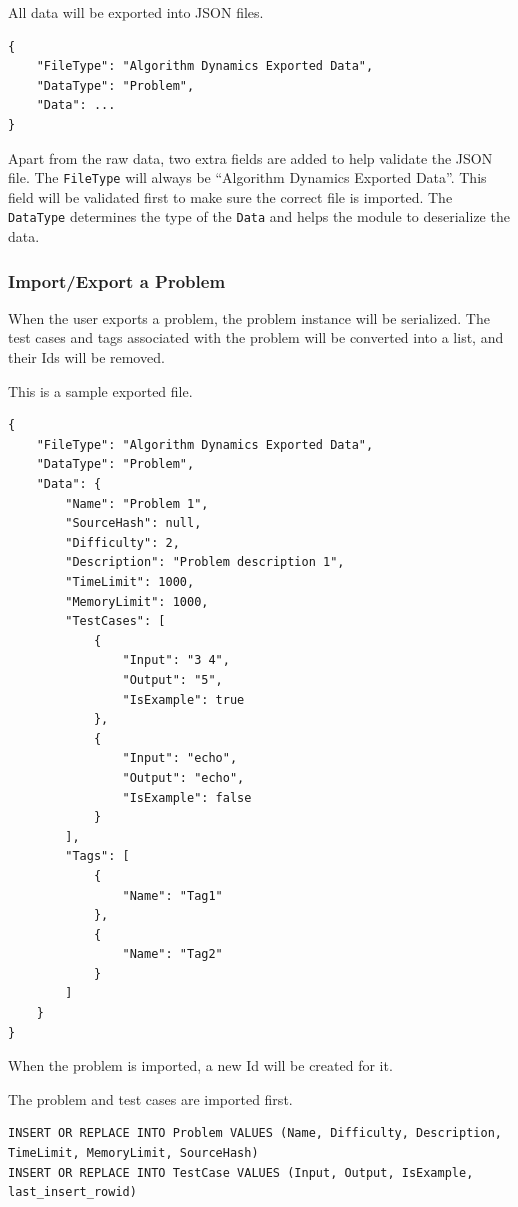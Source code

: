 \documentclass[a4paper]{report}
\newcommand{\code}{\texttt}
\begin{document}
All data will be exported into JSON files.

\begin{verbatim}
{
    "FileType": "Algorithm Dynamics Exported Data",
    "DataType": "Problem",
    "Data": ...
}
\end{verbatim}

Apart from the raw data, two extra fields are added to help validate the JSON file. The \code{FileType} will always be ``Algorithm Dynamics Exported Data''. This field will be validated first to make sure the correct file is imported. The \code{DataType} determines the type of the \code{Data} and helps the module to deserialize the data.

\subsubsection{Import/Export a Problem}

When the user exports a problem, the problem instance will be serialized. The test cases and tags associated with the problem will be converted into a list, and their Ids will be removed.

This is a sample exported file.

\begin{verbatim}
{
    "FileType": "Algorithm Dynamics Exported Data",
    "DataType": "Problem",
    "Data": {
        "Name": "Problem 1",
        "SourceHash": null,
        "Difficulty": 2,
        "Description": "Problem description 1",
        "TimeLimit": 1000,
        "MemoryLimit": 1000,
        "TestCases": [
            {
                "Input": "3 4",
                "Output": "5",
                "IsExample": true
            },
            {
                "Input": "echo",
                "Output": "echo",
                "IsExample": false
            }
        ],
        "Tags": [
            {
                "Name": "Tag1"
            },
            {
                "Name": "Tag2"
            }
        ]
    }
}
\end{verbatim}

When the problem is imported, a new Id will be created for it.

The problem and test cases are imported first.

\begin{verbatim}
INSERT OR REPLACE INTO Problem VALUES (Name, Difficulty, Description, TimeLimit, MemoryLimit, SourceHash)
INSERT OR REPLACE INTO TestCase VALUES (Input, Output, IsExample, last_insert_rowid)
\end{verbatim}
\end{document}
